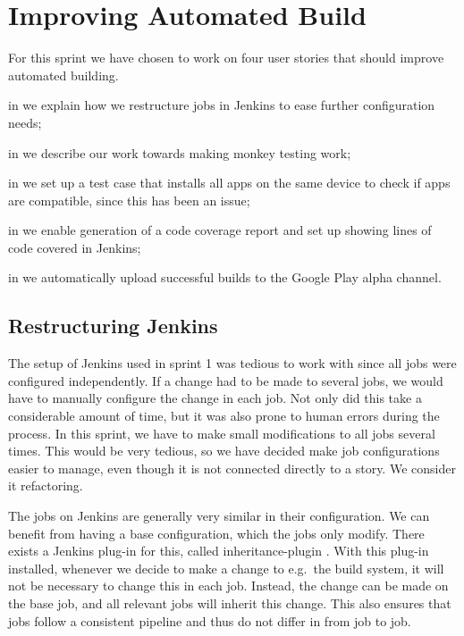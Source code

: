 \chapter{Improving Automated Build}
For this sprint we have chosen to work on four user stories that should improve automated building.

\begin{chapterorganization}
  \item in  we explain how we restructure jobs in Jenkins to ease further configuration needs;
  \item in  we describe our work towards making monkey testing work;
  \item in  we set up a test case that installs all apps on the same device to check if apps are compatible, since this has been an issue;
  \item in  we enable generation of a code coverage report and set up showing lines of code covered in Jenkins;
  \item in  we automatically upload successful builds to the Google Play alpha channel.
\end{chapterorganization}

\section{Restructuring Jenkins}\label{sec:jenkins_restruct}
The setup of Jenkins used in sprint 1 was tedious to work with since all jobs were configured independently. If a change had to be made to several jobs, we would have to manually configure the change in each job. Not only did this take a considerable amount of time, but it was also prone to human errors during the process. In this sprint, we have to make small modifications to all jobs several times. This would be very tedious, so we have decided make job configurations easier to manage, even though it is not connected directly to a story. We consider it refactoring.

The jobs on Jenkins are generally very similar in their configuration. We can benefit from having a base configuration, which the jobs only modify. There exists a Jenkins plug-in for this, called inheritance-plugin \parencite{jenkins-inheritance}. With this plug-in installed, whenever we decide to make a change to e.g.\ the build system, it will not be necessary to change this in each job. Instead, the change can be made on the base job, and all relevant jobs will inherit this change. This also ensures that jobs follow a consistent pipeline and thus do not differ in from job to job.

